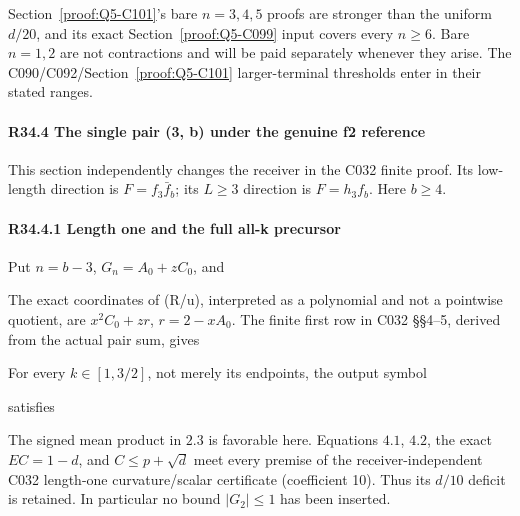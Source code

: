 Section~\ref{proof:Q5-C101}'s bare \(n=3,\allowbreak  4,\allowbreak  5\) proofs are stronger than the uniform \(d/20\),
and its exact Section~\ref{proof:Q5-C099} input covers every \(n\ge6\). Bare \(n=1,\allowbreak  2\) are not
contractions and will be paid separately whenever they arise. The
C090/C092/Section~\ref{proof:Q5-C101} larger-terminal thresholds enter in their stated ranges.

\paragraph{R34.4 The single pair (3, b) under the genuine f2 reference}

This section independently changes the receiver in the C032 finite proof. Its low-length direction is \(F=f_3\bar f_b\); its \(L\ge3\)
direction is \(F=h_3f_b\). Here \(b\ge4\).

\paragraph{R34.4.1 Length one and the full all-k precursor}

Put \(n=b-3\), \(G_n=A_0+zC_0\), and


The exact coordinates of (R/u), interpreted as a polynomial and not a
pointwise quotient, are \(x^2C_0+zr\), \(r=2-xA_0\). The finite first row
in C032 §§4--5, derived from the actual pair sum, gives


For every \(k\in[1,\allowbreak  3/2]\), not merely its endpoints, the output symbol


satisfies


The signed mean product in \(2.3\) is favorable here. Equations \(4.1\),
\(4.2\), the exact \(EC=1-d\), and \(C\le p+\sqrt d\) meet every premise of
the receiver-independent C032 length-one curvature/scalar certificate
(coefficient 10). Thus its \(d/10\) deficit is retained. In particular no
bound \(|G_2|\le1\) has been inserted.

